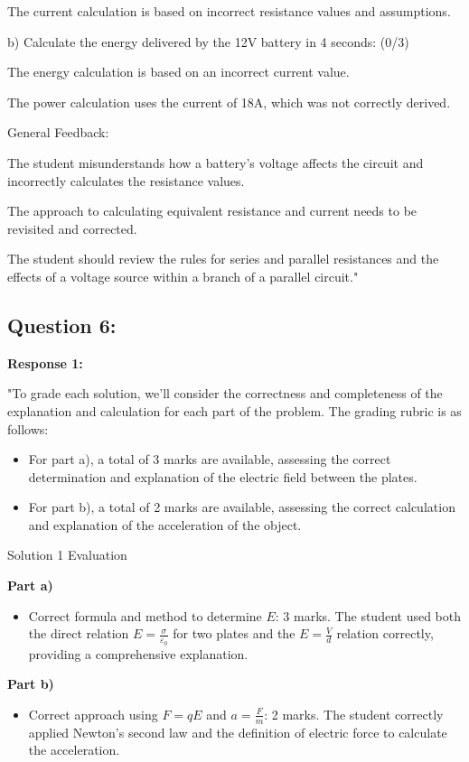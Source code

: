 \documentclass[a4paper,11pt]{article}
\begin{document}
The current calculation is based on incorrect resistance values and assumptions.

b) Calculate the energy delivered by the
12V battery in 4 seconds: (0/3)

The energy calculation is based on an incorrect current value.

The power calculation uses the current of 18A, which was not correctly derived.

General Feedback:

The student misunderstands how a battery's voltage affects the circuit and incorrectly calculates the resistance values.

The approach to calculating equivalent resistance and current needs to be revisited and corrected.

The student should review the rules for series and parallel resistances and the effects of a voltage source within a branch of a parallel circuit."

\subsection*{Question 6:}

\textbf{Response 1:}

"To grade each solution, we'll consider the correctness and completeness of the explanation and calculation for each part of the problem. The grading rubric is as follows:

\begin{itemize}
    \item For part a), a total of 3 marks are available, assessing the correct determination and explanation of the electric field between the plates.
    \item For part b), a total of 2 marks are available, assessing the correct calculation and explanation of the acceleration of the object.
\end{itemize}

Solution 1 Evaluation

\textbf{Part a)}
\begin{itemize}
    \item Correct formula and method to determine \(E\): 3 marks. The student used both the direct relation \(E = \frac{\sigma}{\varepsilon_0}\) for two plates and the \(E = \frac{V}{d}\) relation correctly, providing a comprehensive explanation.
\end{itemize}

\textbf{Part b)}
\begin{itemize}
    \item Correct approach using \(F = qE\) and \(a = \frac{F}{m}\): 2 marks. The student correctly applied Newton's second law and the definition of electric force to calculate the acceleration.
\end{itemize}
\end{document}
